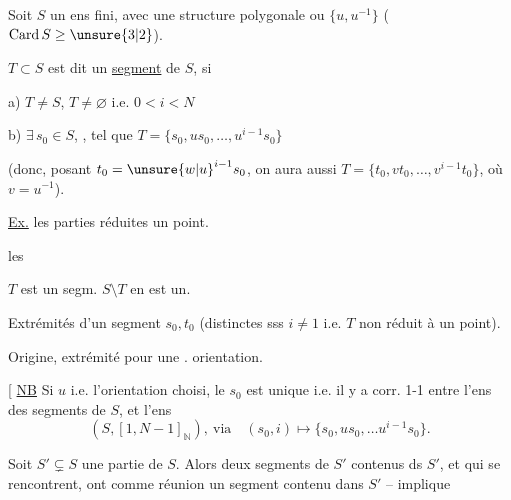Soit $S$ un ens fini, avec une structure polygonale ou  $\{u,u^{-1}\}$ ($\mathrm{Card}\,S\geq\unsure{3|2}$).\unsure{,}

 $T\subset S$  est dit un  \uline{segment} de $S$, si

a)  $T\ne S$, $T\ne\varnothing$  i.e. $0<i<N$

b) $\exists\,s_0\in S$, , tel que $T=\{s_0,us_0,\ldots,u^{i-1}s_0\}$

(donc, posant $t_0={\unsure{w|u}}^{i-1}s_0$, on aura aussi $T=\{t_0,vt_0,\ldots,v^{i-1}t_0\}$, où $v=u^{-1}$).

\uline{Ex.} les parties réduites  un point.

les 


$T$ est un segm.  $S\setminus T$ en est un.



Extrémités d'un segment $s_0,t_0$ (distinctes sss $i\ne1$ i.e. $T$ non réduit à un point).

Origine, extrémité pour une . orientation.

[ \uline{NB} Si $u$ i.e. l'orientation choisi, le $s_0$ est unique i.e. il y a corr. 1-1 entre l'ens des segments de $S$, et l'ens
\[
 (S,[1,N-1]_{\mathbb N}),\ \text{via}\quad (s_0,i)\longmapsto\{s_0,us_0,\ldots u^{i-1}s_0\}.
\]

Soit $S'\subsetneq S$ une partie de $S$. Alors  deux segments de $S'$ contenus ds $S'$, et qui se rencontrent, ont comme réunion un segment  contenu dans $S'$ --  implique
